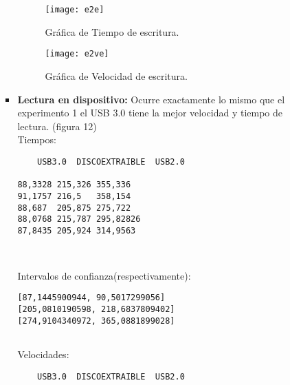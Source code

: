 \documentclass[a4paper, 10pt]{article} %
\begin{document}
\begin{itemize}
\begin{itemize}
\begin{itemize}
\begin{verbatim}
	\end{verbatim}
	\begin{figure}[H]
	\centering 
	\texttt{[image: e2e]} 
	\caption{Gráfica de Tiempo de escritura.} 
	\label{contexto:figura} 
	\end{figure}
	\begin{figure}[H]
	\centering 
	\texttt{[image: e2ve]} 
	\caption{Gráfica de Velocidad de escritura.} 
	\label{contexto:figura} 
	\end{figure}
	\item \textbf{Lectura en dispositivo:} Ocurre exactamente lo mismo que el experimento 1 el USB 3.0 tiene la mejor velocidad y tiempo de lectura. (figura 12)\\
	Tiempos:
	\begin{verbatim}
	USB3.0	DISCOEXTRAIBLE	USB2.0
	
88,3328	215,326	355,336
91,1757	216,5	358,154
88,687	205,875	275,722
88,0768	215,787	295,82826
87,8435	205,924	314,9563



	\end{verbatim}
	Intervalos de confianza(respectivamente): 
	\begin{verbatim}
[87,1445900944, 90,5017299056]
[205,0810190598, 218,6837809402]
[274,9104340972, 365,0881899028]


	\end{verbatim}
	Velocidades:
	\begin{verbatim}
	USB3.0	DISCOEXTRAIBLE	USB2.0
	

\end{verbatim}
\end{itemize}
\end{itemize}
\end{itemize}
\end{document}
